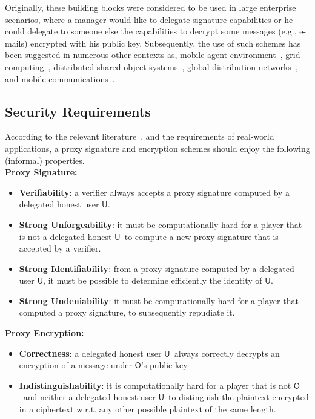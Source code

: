 \documentclass[preprint,authoryear,12pt]{elsarticle}
\newcommand{\Owner}{\ensuremath{\mathsf{O}}}
\newcommand{\User}{\ensuremath{\mathsf{U}}}
\begin{document}
Originally, these building blocks were considered to be used in large enterprise scenarios, where a manager would like to delegate signature capabilities or he could delegate to  someone else the capabilities to decrypt some messages (e.g., e-mails) encrypted with his public key. Subsequently,  the use of such schemes has been suggested in numerous other contexts as, mobile agent environment~\citep{DBLP:conf/acisp/LeeKK01}, grid computing~\citep{DBLP:conf/ccs/FosterKTT98}, distributed shared object systems~\citep{DBLP:conf/sec/LeiwoHHT00}, global distribution networks~\citep{DBLP:conf/nca/BakkerST01}, and mobile communications~\citep{DBLP:conf/icics/ParkL01}.

\subsection{Security Requirements}
According to the relevant literature~\citep{DBLP:conf/acisp/LeeKK012,DBLP:conf/ccs/MamboUO96}, and
the requirements of real-world applications, a proxy signature and encryption schemes should 
enjoy the following (informal) properties. \bigskip\\
\noindent
{\bf Proxy Signature:} 
\begin{itemize}
\item {\bf Verifiability}: a verifier always accepts a proxy signature computed by a delegated honest user \User.
\item  {\bf Strong Unforgeability}: it must be computationally hard for a player that is not a delegated honest \User\ to compute a new proxy signature that is accepted by a verifier.
\item {\bf Strong Identifiability}: from a proxy signature computed by a delegated user \User, it must be possible to determine efficiently the identity of \User.
\item {\bf Strong Undeniability}:
it must be computationally hard for a player that computed a proxy signature, to subsequently repudiate it.
\end{itemize}

\bigskip
\noindent
{\bf Proxy Encryption:} 
\begin{itemize}
\item {\bf Correctness}: a delegated honest user \User\ always correctly decrypts an encryption of a message under \Owner's public key.
\item {\bf Indistinguishability}: it is computationally hard for a player that is not \Owner\ and neither a delegated honest user
\User\ to distinguish the plaintext encrypted in a ciphertext w.r.t. any other possible plaintext of the same length.
\end{itemize}
\end{document}
